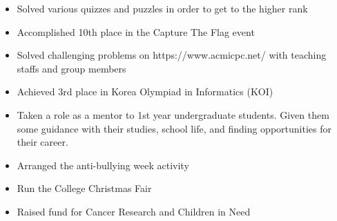 \documentclass[10pt,a4paper,ragged2e]{altacv}
\begin{document}
\divider


\begin{itemize}

\item Solved various quizzes and puzzles in order to get to the higher rank
\item Accomplished 10th place in the Capture The Flag event

\end{itemize}

\divider


\begin{itemize}

\item Solved challenging problems on https://www.acmicpc.net/ with teaching staffs and group members
\item Achieved 3rd place in Korea Olympiad in Informatics (KOI)

\end{itemize}



\begin{itemize}

\item Taken a role as a mentor to 1st year undergraduate students.
Given them some guidance with their studies, school life, and finding opportunities for their career. 

\end{itemize}

\divider


\begin{itemize}

\item Arranged the anti-bullying week activity
\item Run the College Christmas Fair
\item Raised fund for Cancer Research and Children in Need

\end{itemize}
\end{document}
